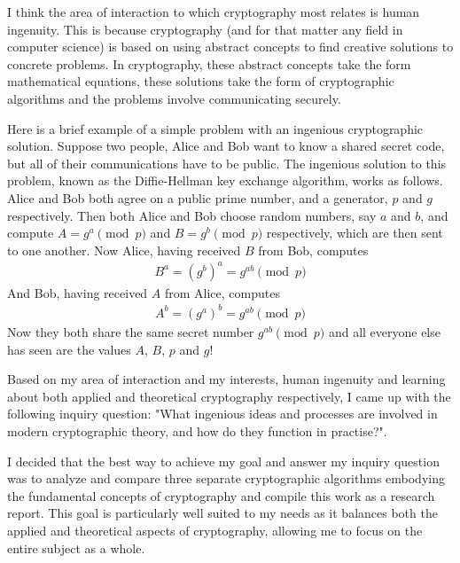 \documentclass[12pt, a4paper, draft]{report}
\begin{document}
I think the area of interaction to which cryptography most relates is
human ingenuity. This is because cryptography (and for that matter any
field in computer science) is based on using abstract concepts to find
creative solutions to concrete problems. In cryptography, these abstract
concepts take the form mathematical equations, these solutions take the form
of cryptographic algorithms and the problems involve communicating securely.

Here is a brief example of a simple problem with an ingenious cryptographic
solution. Suppose two people, Alice and Bob want to know a shared secret
code, but all of their communications have to be public. The ingenious
solution to this problem, known as the Diffie-Hellman key exchange algorithm,
works as follows. Alice and Bob both agree on a public prime number, and
a generator\footnotemark, $p$ and $g$ respectively. Then both Alice and Bob
choose random numbers, say $a$ and $b$, and compute $A = g^a \pmod{p}$ and
$B = g^b \pmod{p}$ respectively, which are then sent to one another. Now
Alice, having received $B$ from Bob, computes
\begin{align*}
B^a = (g^b)^a = g^{ab} \pmod{p}
\end{align*}
And Bob, having received $A$ from Alice, computes
\begin{align*}
A^b = (g^a)^b = g^{ab} \pmod{p}
\end{align*}
Now they both share the same secret number $g^{ab} \pmod{p}$ and all
everyone else has seen are the values $A$, $B$, $p$ and $g$!

Based on my area of interaction and my interests, human ingenuity and
learning about both applied and theoretical cryptography respectively, I
came up with the following inquiry question: "What ingenious ideas and
processes are involved in modern cryptographic theory, and how do they
function in practise?".

I decided that the best way to achieve my goal and answer my inquiry
question was to analyze and compare three separate cryptographic algorithms
embodying the fundamental concepts of cryptography and compile this
work as a research report. This goal is particularly well suited to my
needs as it balances both the applied and theoretical aspects of cryptography,
allowing me to focus on the entire subject as a whole.
\end{document}
